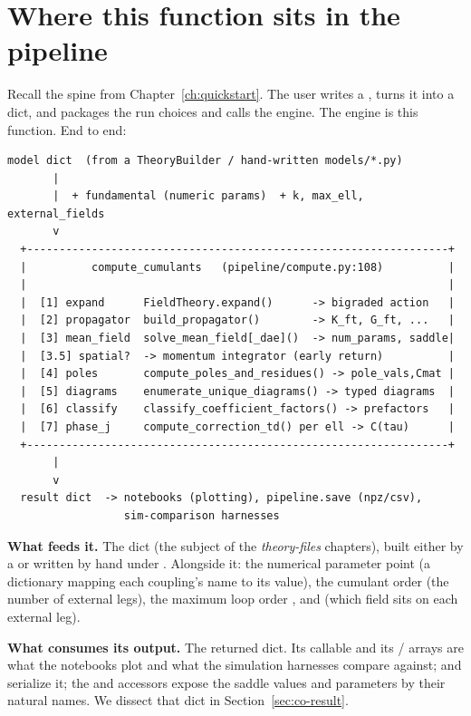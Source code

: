 \section{Where this function sits in the pipeline}\label{sec:co-where}

Recall the spine from Chapter~\ref{ch:quickstart}. The user writes a
,  turns it into a  dict, and
 packages the run choices and calls the engine. The engine is this
function. End to end:

\begin{lstlisting}[style=console]
  model dict  (from a TheoryBuilder / hand-written models/*.py)
       |
       |  + fundamental (numeric params)  + k, max_ell, external_fields
       v
  +-----------------------------------------------------------------+
  |          compute_cumulants   (pipeline/compute.py:108)          |
  |                                                                 |
  |  [1] expand      FieldTheory.expand()      -> bigraded action   |
  |  [2] propagator  build_propagator()        -> K_ft, G_ft, ...   |
  |  [3] mean_field  solve_mean_field[_dae]()  -> num_params, saddle|
  |  [3.5] spatial?  -> momentum integrator (early return)          |
  |  [4] poles       compute_poles_and_residues() -> pole_vals,Cmat |
  |  [5] diagrams    enumerate_unique_diagrams() -> typed diagrams  |
  |  [6] classify    classify_coefficient_factors() -> prefactors   |
  |  [7] phase_j     compute_correction_td() per ell -> C(tau)      |
  +-----------------------------------------------------------------+
       |
       v
  result dict  -> notebooks (plotting), pipeline.save (npz/csv),
                  sim-comparison harnesses
\end{lstlisting}

\textbf{What feeds it.} The  dict (the subject of the
\emph{theory-files} chapters), built either by a  or written
by hand under . Alongside it: the numerical parameter point
 (a dictionary mapping each coupling's name to its value), the
cumulant order  (the number of external legs), the maximum loop order
, and  (which field sits on each external
leg).

\textbf{What consumes its output.} The returned  dict. Its
 callable and its  /  arrays
are what the notebooks plot and what the simulation harnesses compare against;
 and  serialize it; the 
and  accessors expose the saddle values and parameters by their
natural names. We dissect that dict in Section~\ref{sec:co-result}.

